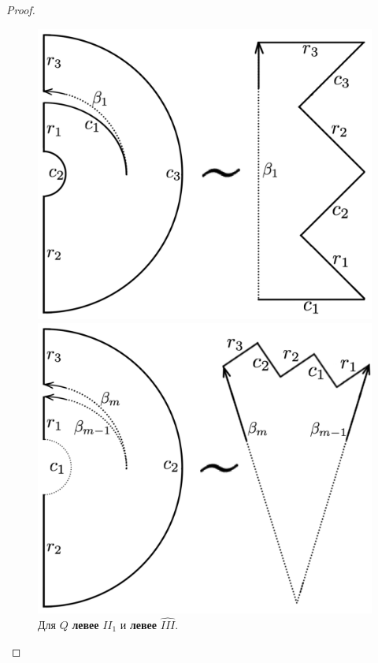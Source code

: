 \begin{proof}
\begin{figure}[!htb]
\centering
\includegraphics[scale=0.1]{images/section3_circular/atoms/branching/terminal_min_transformed_2.pdf}
    \caption{Для $Q$ \textbf{левее} $II_1$ и \textbf{левее} $\widehat{III}$.}
    \label{fig:pt10:_terminal_min_domain_2}
\endminipage\hfill
{}
\centering
\includegraphics[scale=0.1]{images/section3_circular/atoms/branching/branching_domain_transformed_2.pdf}

\end{figure}
\end{proof}
